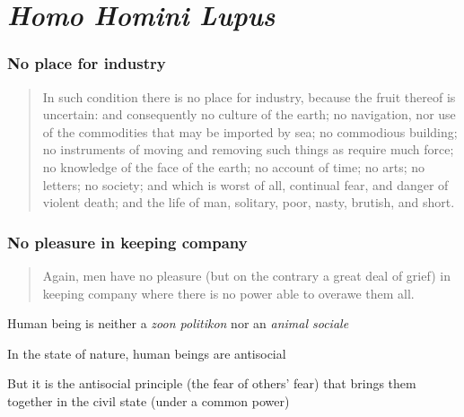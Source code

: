 \section{\textit{Homo Homini Lupus}}

        \subsubsection{No place for industry}

            \begin{quote}
                In such condition there is no place for industry, because the fruit thereof is uncertain: and consequently no culture of the earth; no navigation, nor use of the commodities that may be imported by sea; no commodious building; no instruments of moving and removing such things as require much force; no knowledge of the face of the earth; no account of time; no arts; no letters; no society; and which is worst of all, continual fear, and danger of violent death; and the life of man, solitary, poor, nasty, brutish, and short.
            \end{quote}

        \subsubsection{No pleasure in keeping company}

            \begin{quote}
                Again, men have no pleasure (but on the contrary a great deal of grief) in keeping company where there is no power able to overawe them all.
            \end{quote}

    \begin{remark}
        Human being is neither a \textit{zoon politikon} nor an \textit{animal sociale}

        In the state of nature, human beings are antisocial

        But it is the antisocial principle (the fear of others’ fear) that brings them together in the civil state (under a common power)
    \end{remark}






